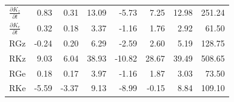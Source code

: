 \documentclass[10pt]{article}
\begin{document}
\begin{table}[!htbp]
\begin{tabular}{lrrrrrrr}
$\frac{\partial K_z}{\partial t}$ & 0.83 & 0.31 & 13.09 & -5.73 & 7.25 & 12.98 & 251.24 \\
$\frac{\partial K_e}{\partial t}$ & 0.32 & 0.18 & 3.37 & -1.16 & 1.76 & 2.92 & 61.50 \\
RGz & -0.24 & 0.20 & 6.29 & -2.59 & 2.60 & 5.19 & 128.75 \\
RKz & 9.03 & 6.04 & 38.93 & -10.82 & 28.67 & 39.49 & 508.65 \\
RGe & 0.18 & 0.17 & 3.97 & -1.16 & 1.87 & 3.03 & 73.50 \\
RKe & -5.59 & -3.37 & 9.13 & -8.99 & -0.15 & 8.84 & 109.10 \\
\bottomrule
\end{tabular}
\end{table}
\end{document}
